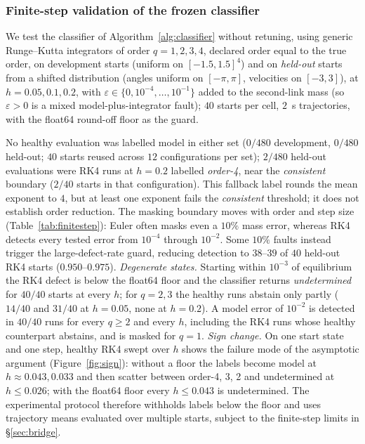 \documentclass[10pt]{article}
\theoremstyle{definition}
\newcommand{\fittable}[2][\linewidth]{%
  \sbox{\tablebox}{#2}%
  \ifdim\wd\tablebox>#1\relax
    \resizebox{#1}{!}{\usebox{\tablebox}}%
  \else
    \usebox{\tablebox}%
  \fi}
\begin{document}
\subsubsection{Finite-step validation of the frozen classifier}\label{sec:exp:finite}

We test the classifier of Algorithm~\ref{alg:classifier} without retuning, using generic
Runge--Kutta integrators of order $q=1,2,3,4$, declared order equal to the true
order, on development starts (uniform on $[-1.5,1.5]^4$) and on \emph{held-out}
starts from a shifted distribution (angles uniform on $[-\pi,\pi]$, velocities on
$[-3,3]$), at $h=0.05,0.1,0.2$, with $\varepsilon\in\{0,10^{-4},\dots,10^{-1}\}$
added to the second-link mass (so $\varepsilon>0$ is a mixed model-plus-integrator
fault); $40$ starts per cell, $2$~s trajectories, with the float64 round-off floor
as the guard.

\begin{table}[htbp]
\centering\small
\fittable{}
\caption{Held-out starts: healthy runs flagged, and the model rate with its
$95\%$ Wilson interval, for an integrator of true order $q$.}
\label{tab:finitestep}
\end{table}

No healthy evaluation was labelled model in either set ($0/480$ development, $0/480$ held-out; $40$ starts reused across $12$ configurations per set); $2/480$
held-out evaluations were RK4 runs at $h=0.2$ labelled \emph{order-4}, near the
\emph{consistent} boundary ($2/40$ starts in that configuration). This fallback
label rounds the mean exponent to $4$, but at least one exponent fails the
\emph{consistent} threshold; it does not establish order reduction.
The masking boundary moves with order and step size
(Table~\ref{tab:finitestep}): Euler often masks even a $10\%$ mass error,
whereas RK4 detects every tested error from $10^{-4}$ through $10^{-2}$.
Some $10\%$ faults instead trigger the
large-defect-rate guard, reducing detection to $38$--$39$ of $40$ held-out
RK4 starts ($0.950$--$0.975$). \emph{Degenerate states.} Starting within $10^{-3}$ of
equilibrium the RK4 defect is below the float64 floor and the classifier returns \emph{undetermined} for $40/40$ starts at every $h$; for $q=2,3$ the healthy runs abstain only partly ($14/40$ and $31/40$ at $h=0.05$, none at $h=0.2$).
A model error of $10^{-2}$ is detected in $40/40$ runs for every $q\ge2$ and every $h$, including the RK4 runs whose healthy
counterpart abstains, and is masked for $q=1$.
\emph{Sign change.} On one start state and one step, healthy RK4 swept over $h$ shows the failure mode of the
asymptotic argument (Figure~\ref{fig:sign}): without a floor the labels become model at $h\approx0.043,0.033$ and then scatter between
order-4, 3, 2 and undetermined at $h\le0.026$; with the float64 floor every $h\le0.043$ is undetermined. The experimental protocol therefore withholds labels below the floor and
uses trajectory means evaluated over multiple starts, subject to the
finite-step limits in \S\ref{sec:bridge}.
\end{document}
